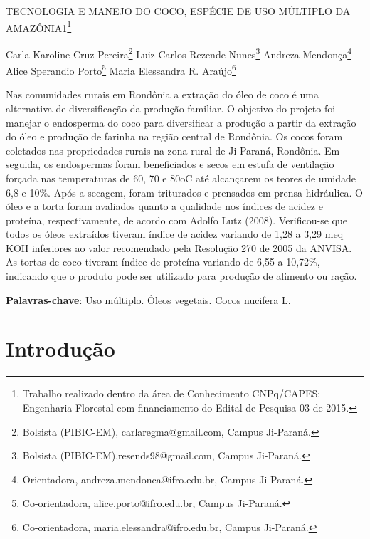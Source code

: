 \documentclass[article,12pt,onesidea,4paper,english,brazil]{abntex2}
\begin{document}
	
	
	\frenchspacing 
	
	\begin{center}
		\LARGE TECNOLOGIA E MANEJO DO COCO, ESPÉCIE DE USO MÚLTIPLO DA AMAZÔNIA1\footnote{Trabalho realizado dentro da área de Conhecimento CNPq/CAPES: Engenharia Florestal com financiamento do Edital de Pesquisa 03 de 2015.}
		
		\normalsize
	Carla Karoline Cruz Pereira\footnote{Bolsista (PIBIC-EM), carlaregma@gmail.com, Campus Ji-Paraná.} 
		Luiz Carlos Rezende Nunes\footnote{Bolsista (PIBIC-EM),resends98@gmail.com, Campus Ji-Paraná.} 
		Andreza Mendonça\footnote{Orientadora, andreza.mendonca@ifro.edu.br, Campus Ji-Paraná.} 
		Alice Sperandio Porto\footnote{Co-orientadora, alice.porto@ifro.edu.br, Campus Ji-Paraná.}
	Maria Elessandra R. Araújo\footnote{Co-orientadora, maria.elessandra@ifro.edu.br, Campus Ji-Paraná.} 
	\end{center}
	
	\begin{resumoumacoluna}
	Nas comunidades rurais em Rondônia a extração do óleo de coco é uma alternativa de diversificação da produção familiar. O objetivo do projeto foi manejar o endosperma do coco para diversificar a produção a partir da extração do óleo e produção de farinha na região central de Rondônia. Os cocos foram coletados nas propriedades rurais na zona rural de Ji-Paraná, Rondônia. Em seguida, os endospermas foram beneficiados e secos em estufa de ventilação forçada nas temperaturas de 60, 70 e 80oC até alcançarem os teores de umidade 6,8 e 10\%. Após a secagem, foram triturados e prensados em prensa hidráulica. O óleo e a torta foram avaliados quanto a qualidade nos índices de acidez e proteína, respectivamente, de acordo com Adolfo Lutz (2008). Verificou-se que todos os óleos extraídos tiveram índice de acidez variando de 1,28 a 3,29 meq KOH inferiores ao valor recomendado pela Resolução 270 de 2005 da ANVISA. As tortas de coco tiveram índice de proteína variando de 6,55 a 10,72\%, indicando que o produto pode ser utilizado para produção de alimento ou ração.
		\vspace{\onelineskip}
		
		\noindent
		\textbf{Palavras-chave}: Uso múltiplo. Óleos vegetais. Cocos nucifera L.
	\end{resumoumacoluna}
	
	\textual
	
	\section*{Introdução}
	
\end{document}
